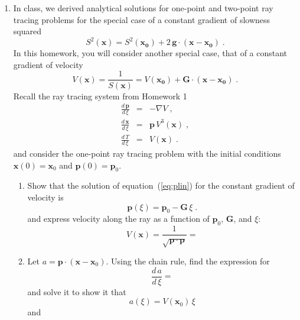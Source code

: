 \begin{enumerate}
\item In class, we derived analytical solutions for one-point and
two-point ray tracing problems for the special case of a constant
gradient of slowness squared 
\begin{equation}
  \label{eq:s2}
  S^2(\mathbf{x}) =
  S^2(\mathbf{x_0})+2\,\mathbf{g} \cdot (\mathbf{x}-\mathbf{x_0})\;.
\end{equation}
In this homework, you will consider another special case, that of a
constant gradient of velocity
\begin{equation}
  \label{eq:s2}
  V(\mathbf{x}) = \frac{1}{S(\mathbf{x})} =
  V(\mathbf{x_0})+\mathbf{G} \cdot (\mathbf{x}-\mathbf{x_0})\;.
\end{equation}
Recall the ray tracing system from Homework 1
\begin{eqnarray}
  \label{eq:plin}
  \frac{d\,\mathbf{p}}{d\,\xi} & = & -\nabla V\;, \\
  \label{eq:xlin}
  \frac{d\,\mathbf{x}}{d\,\xi} & = &
  \mathbf{p}\,V^3(\mathbf{x})\;, \\
  \label{eq:tlin}
  \frac{d\,T}{d\,\xi} & = & V(\mathbf{x})\;.
\end{eqnarray}
and consider the one-point ray tracing problem with the initial conditions
$\mathbf{x}(0)= \mathbf{x}_0$ and $\mathbf{p}(0)=\mathbf{p}_0$.
\begin{enumerate}
\item  Show that the solution of
equation~(\ref{eq:plin}) for the constant gradient of velocity is
\begin{equation}
  \label{eq:pcir}
  \mathbf{p}(\xi) =  \mathbf{p}_0 - \mathbf{G}\,\xi\;.
\end{equation}
and express velocity along the ray as a function of
  $\mathbf{p}_0$, $\mathbf{G}$, and $\xi$:
  \begin{equation}
\label{eq:vsol}
V(\mathbf{x}) = \frac{1}{\sqrt{\mathbf{p} \cdot \mathbf{p}}} = 
\end{equation}
\item Let $a = \mathbf{p} \cdot (\mathbf{x} - \mathbf{x}_0)$. Using
  the chain rule, find the expression for
  \begin{equation}
    \frac{d\,a}{d\,\xi} = 
  \end{equation}
  and solve it to show it that 
  \begin{equation}
    \label{eq:asol}
    a(\xi) = V(\mathbf{x}_0)\,\xi
  \end{equation}
  and
  \begin{equation}

\end{equation}
\end{enumerate}
\end{enumerate}
